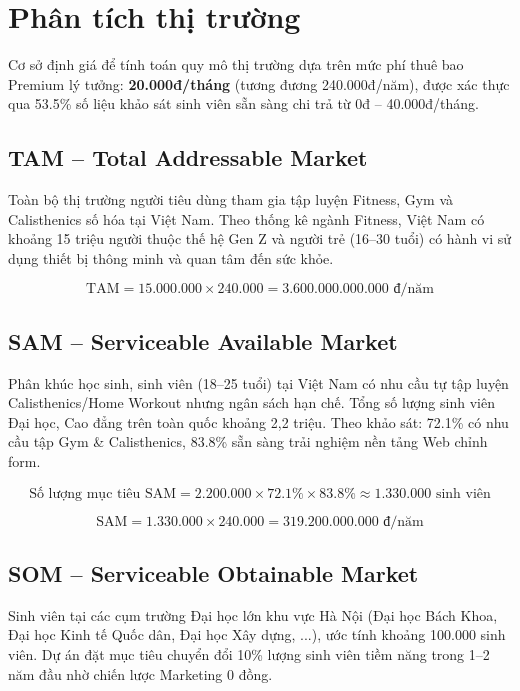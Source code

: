 \documentclass[a4paper,12pt]{article}
\begin{document}
\section{Phân tích thị trường}

Cơ sở định giá để tính toán quy mô thị trường dựa trên mức phí thuê bao Premium lý tưởng: \textbf{20.000đ/tháng} (tương đương 240.000đ/năm), được xác thực qua 53.5\% số liệu khảo sát sinh viên sẵn sàng chi trả từ 0đ -- 40.000đ/tháng.

\subsection{TAM -- Total Addressable Market}
Toàn bộ thị trường người tiêu dùng tham gia tập luyện Fitness, Gym và Calisthenics số hóa tại Việt Nam. Theo thống kê ngành Fitness, Việt Nam có khoảng 15 triệu người thuộc thế hệ Gen Z và người trẻ (16--30 tuổi) có hành vi sử dụng thiết bị thông minh và quan tâm đến sức khỏe.

\begin{equation}
    \text{TAM} = 15.000.000 \times 240.000 = 3.600.000.000.000 \text{ đ/năm}
\end{equation}

\subsection{SAM -- Serviceable Available Market}
Phân khúc học sinh, sinh viên (18--25 tuổi) tại Việt Nam có nhu cầu tự tập luyện Calisthenics/Home Workout nhưng ngân sách hạn chế. Tổng số lượng sinh viên Đại học, Cao đẳng trên toàn quốc khoảng 2,2 triệu. Theo khảo sát: 72.1\% có nhu cầu tập Gym \& Calisthenics, 83.8\% sẵn sàng trải nghiệm nền tảng Web chỉnh form.

\begin{equation}
    \text{Số lượng mục tiêu SAM} = 2.200.000 \times 72.1\% \times 83.8\% \approx 1.330.000 \text{ sinh viên}
\end{equation}

\begin{equation}
    \text{SAM} = 1.330.000 \times 240.000 = 319.200.000.000 \text{ đ/năm}
\end{equation}

\subsection{SOM -- Serviceable Obtainable Market}
Sinh viên tại các cụm trường Đại học lớn khu vực Hà Nội (Đại học Bách Khoa, Đại học Kinh tế Quốc dân, Đại học Xây dựng, ...), ước tính khoảng 100.000 sinh viên. Dự án đặt mục tiêu chuyển đổi 10\% lượng sinh viên tiềm năng trong 1--2 năm đầu nhờ chiến lược Marketing 0 đồng.
\end{document}
